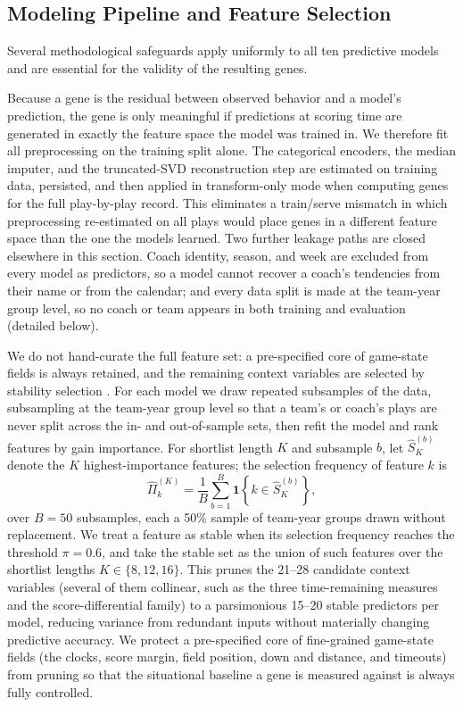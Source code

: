 \documentclass[USenglish]{article}
\theoremstyle{dgthm}
\theoremstyle{dgdef}
\begin{document}
\subsection{Modeling Pipeline and Feature Selection}
\label{sec:pipeline}

Several methodological safeguards apply uniformly to all ten predictive models and are essential for the validity of the resulting genes.

Because a gene is the residual between observed behavior and a model's prediction, the gene is only meaningful if predictions at scoring time are generated in exactly the feature space the model was trained in. We therefore fit all preprocessing on the training split alone. The categorical encoders, the median imputer, and the truncated-SVD reconstruction step are estimated on training data, persisted, and then applied in transform-only mode when computing genes for the full play-by-play record. This eliminates a train/serve mismatch in which preprocessing re-estimated on all plays would place genes in a different feature space than the one the models learned. Two further leakage paths are closed elsewhere in this section. Coach identity, season, and week are excluded from every model as predictors, so a model cannot recover a coach's tendencies from their name or from the calendar; and every data split is made at the team-year group level, so no coach or team appears in both training and evaluation (detailed below).

We do not hand-curate the full feature set: a pre-specified core of game-state fields is always retained, and the remaining context variables are selected by stability selection \citep{meinshausen2010}. For each model we draw repeated subsamples of the data, subsampling at the team-year group level so that a team's or coach's plays are never split across the in- and out-of-sample sets, then refit the model and rank features by gain importance. For shortlist length $K$ and subsample $b$, let $\hat{S}^{(b)}_{K}$ denote the $K$ highest-importance features; the selection frequency of feature $k$ is
\begin{equation}
\hat{\Pi}_k^{(K)} = \frac{1}{B}\sum_{b=1}^{B} \mathbf{1}\!\left\{k \in \hat{S}^{(b)}_{K}\right\},
\end{equation}
over $B = 50$ subsamples, each a 50\% sample of team-year groups drawn without replacement. We treat a feature as stable when its selection frequency reaches the threshold $\pi = 0.6$, and take the stable set as the union of such features over the shortlist lengths $K \in \{8, 12, 16\}$. This prunes the 21--28 candidate context variables (several of them collinear, such as the three time-remaining measures and the score-differential family) to a parsimonious 15--20 stable predictors per model, reducing variance from redundant inputs without materially changing predictive accuracy. We protect a pre-specified core of fine-grained game-state fields (the clocks, score margin, field position, down and distance, and timeouts) from pruning so that the situational baseline a gene is measured against is always fully controlled.
\end{document}
